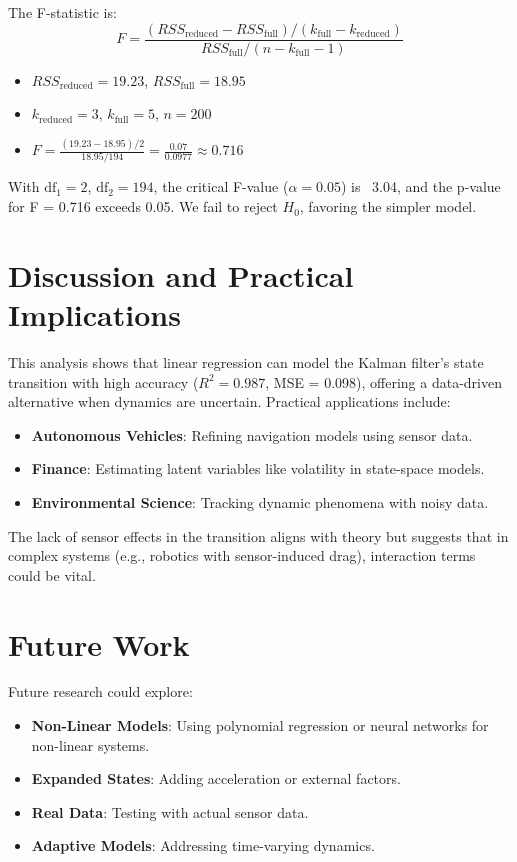 \documentclass[12pt]{article}
\begin{document}
The F-statistic is:
\[
F = \frac{(RSS_{\text{reduced}} - RSS_{\text{full}}) / (k_{\text{full}} - k_{\text{reduced}})}{RSS_{\text{full}} / (n - k_{\text{full}} - 1)}
\]
\begin{itemize}
    \item \( RSS_{\text{reduced}} = 19.23 \), \( RSS_{\text{full}} = 18.95 \)
    \item \( k_{\text{reduced}} = 3 \), \( k_{\text{full}} = 5 \), \( n = 200 \)
    \item \( F = \frac{(19.23 - 18.95) / 2}{18.95 / 194} = \frac{0.07}{0.0977} \approx 0.716 \)
\end{itemize}

With \( \text{df}_1 = 2 \), \( \text{df}_2 = 194 \), the critical F-value (\( \alpha = 0.05 \)) is ~3.04, and the p-value for F = 0.716 exceeds 0.05. We fail to reject \( H_0 \), favoring the simpler model.

\section{Discussion and Practical Implications}
\label{sec:discussion}

This analysis shows that linear regression can model the Kalman filter’s state transition with high accuracy (\( R^2 = 0.987 \), MSE = 0.098), offering a data-driven alternative when dynamics are uncertain. Practical applications include:
\begin{itemize}
    \item \textbf{Autonomous Vehicles}: Refining navigation models using sensor data.
    \item \textbf{Finance}: Estimating latent variables like volatility in state-space models.
    \item \textbf{Environmental Science}: Tracking dynamic phenomena with noisy data.
\end{itemize}

The lack of sensor effects in the transition aligns with theory but suggests that in complex systems (e.g., robotics with sensor-induced drag), interaction terms could be vital.

\section{Future Work}
\label{sec:future-work}

Future research could explore:
\begin{itemize}
    \item \textbf{Non-Linear Models}: Using polynomial regression or neural networks for non-linear systems.
    \item \textbf{Expanded States}: Adding acceleration or external factors.
    \item \textbf{Real Data}: Testing with actual sensor data.
    \item \textbf{Adaptive Models}: Addressing time-varying dynamics.
\end{itemize}
\end{document}
